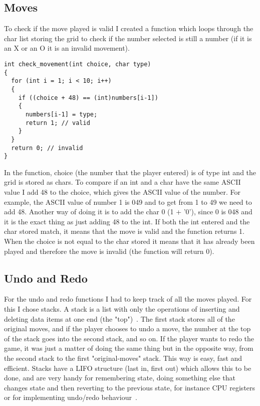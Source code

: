 \documentclass[10pt, a4paper]{article}
\begin{document}
    \subsection{Moves}

To check if the move played is valid I created a function which loops through the char list storing the grid to check if the number selected is still a number (if it is an X or an O it is an invalid movement).

\begin{lstlisting}
int check_movement(int choice, char type)
{
  for (int i = 1; i < 10; i++)
  {
    if ((choice + 48) == (int)numbers[i-1])
    {
      numbers[i-1] = type;
      return 1; // valid
    }
  }
  return 0; // invalid
}
\end{lstlisting}

In the function, choice (the number that the player entered) is of type int and the grid is stored as chars. To compare if an int and a char have the same ASCII value I add 48 to the choice, which gives the ASCII value of the number. For example, the ASCII value of number 1 is 049 and to get from 1 to 49 we need to add 48. Another way of doing it is to add the char 0 (1 + '0'), since 0 is 048 and it is the exact thing as just adding 48 to the int. If both the int entered and the char stored match, it means that the move is valid and the function returns 1. When the choice is not equal to the char stored it means that it has already been played and therefore the move is invalid (the function will return 0).

    \subsection{Undo and Redo}

For the undo and redo functions I had to keep track of all the moves played. For this I chose stacks. A stack is a list with only the operations of inserting and deleting data items at one end (the "top")~\cite{mehlhorn_sanders_2008}. The first stack stores all of the original moves, and if the player chooses to undo a move, the number at the top of the stack goes into the second stack, and so on. If the player wants to redo the game, it was just a matter of doing the same thing but in the opposite way, from the second stack to the first "original-moves" stack. This way is easy, fast and efficient. Stacks have a LIFO structure (last in, first out) which allows this to be done, and are very handy for remembering state, doing something else that changes state and then reverting to the previous state, for instance CPU registers or for implementing undo/redo behaviour~\cite{raghuwanshi_2016}.
\end{document}
